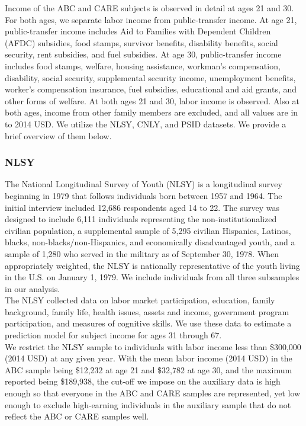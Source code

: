 \noindent Income of the ABC and CARE subjects is observed in detail at ages 21 and 30. For both ages,
we separate labor income from public-transfer income. At age 21, public-transfer income includes Aid to
Families with Dependent Children (AFDC) subsidies, food stamps, survivor benefits, disability
benefits, social security, rent subsidies, and fuel subsidies. At age 30, public-transfer income includes food stamps, welfare, housing assistance, workman's
compensation, disability, social security, supplemental security income, unemployment benefits,
worker's compensation insurance, fuel subsidies, educational and aid grants, and other forms of welfare.
At both ages 21 and 30, labor income is observed. Also at both ages, income from other family members are excluded, and all values are in
to 2014 USD. We utilize the
NLSY, CNLY, and PSID datasets. We provide a brief overview of them below. \\

\subsubsection{NLSY}
\label{app:subject_income_nlsy}

\noindent The National Longitudinal Survey of Youth (NLSY) is a longitudinal survey beginning in 1979
that follows individuals born between 1957 and 1964. The initial interview included
12,686 respondents aged 14 to 22. The survey was designed to include 6,111
individuals representing the non-institutionalized civilian population, a supplemental
sample of 5,295 civilian Hispanics, Latinos, blacks, non-blacks/non-Hispanics, and economically
disadvantaged youth, and a sample of 1,280 who served in the military as of September 30,
1978. When appropriately weighted, the NLSY is nationally representative of the youth
living in the U.S. on January 1, 1979. We include individuals from all three subsamples
in our analysis. \\

\noindent The NLSY collected data on labor market participation, education, family background,
family life, health issues, assets and income, government program participation, and
measures of cognitive skills. We use these data to estimate a prediction model for
subject income for ages 31 through 67. \\

\noindent We restrict the NLSY sample to individuals with labor income less than
\$300,000 (2014 USD) at any given year. With the mean labor income (2014 USD) in the ABC
sample being \$12,232 at age 21 and \$32,782 at age 30, and the maximum reported
being \$189,938, the cut-off we impose on the auxiliary data is high enough
so that everyone in the ABC  and CARE samples are represented, yet low enough to
exclude high-earning individuals in the auxiliary sample that do not reflect the ABC or CARE samples well. \\

